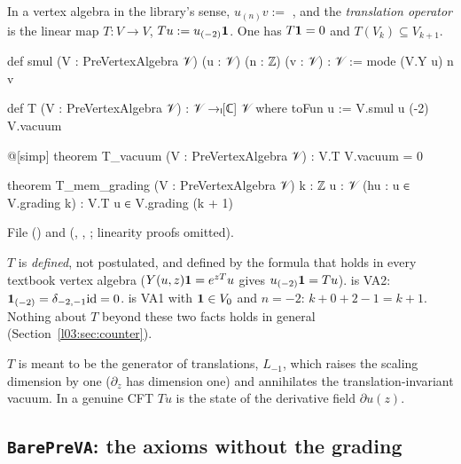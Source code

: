 \begin{definition}\label{l03:def:smulT}
In a vertex algebra in the library's sense, $u_{(n)}v := $ , and the
\emph{translation operator} is the linear map $T:V\to V$, $Tu := u_{(-2)}\mathbf{1}$. One has
$T\mathbf{1} = 0$ and $T(V_k)\subseteq V_{k+1}$.
\end{definition}
\begin{leancode}
def smul (V : PreVertexAlgebra 𝒱) (u : 𝒱) (n : ℤ) (v : 𝒱) : 𝒱 := mode (V.Y u) n v

def T (V : PreVertexAlgebra 𝒱) : 𝒱 →ₗ[ℂ] 𝒱 where
  toFun u := V.smul u (-2) V.vacuum

@[simp] theorem T_vacuum (V : PreVertexAlgebra 𝒱) : V.T V.vacuum = 0

theorem T_mem_grading (V : PreVertexAlgebra 𝒱) {k : ℤ} {u : 𝒱} (hu : u ∈ V.grading k) :
    V.T u ∈ V.grading (k + 1)
\end{leancode}
File  () and
 (, ,
; linearity proofs omitted).

\begin{dictionary}
$T$ is \emph{defined}, not postulated, and defined by the formula that holds in every textbook
vertex algebra ($Y(u,z)\mathbf{1} = e^{zT}u$ gives $u_{(-2)}\mathbf{1} = Tu$).  is
VA2: $\mathbf{1}_{(-2)} = \delta_{-2,-1}\mathrm{id} = 0$.  is VA1 with
$\mathbf{1}\in V_0$ and $n=-2$: $k+0+2-1 = k+1$. Nothing about $T$ beyond these two facts holds in
general (Section~\ref{l03:sec:counter}).
\end{dictionary}

\begin{physics}
$T$ is meant to be the generator of translations, $L_{-1}$, which raises the scaling dimension by
one ($\partial_z$ has dimension one) and annihilates the translation-invariant vacuum. In a genuine
CFT $Tu$ is the state of the derivative field $\partial u(z)$.
\end{physics}

\subsection{\texttt{BarePreVA}: the axioms without the grading}

